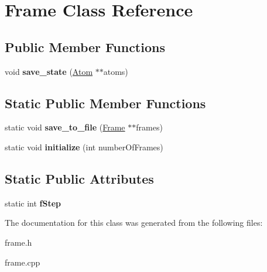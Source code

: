 \hypertarget{class_frame}{}\section{Frame Class Reference}
\label{class_frame}
\subsection*{Public Member Functions}
\begin{DoxyCompactItemize}
\item 
\mbox{\label{class_frame_a03b0febb7a423f343a97f5b937ca74bb}} 
void {\bfseries save\+\_\+state} (\mbox{\hyperlink{class_atom}{Atom}} $\ast$$\ast$atoms)
\end{DoxyCompactItemize}
\subsection*{Static Public Member Functions}
\begin{DoxyCompactItemize}
\item 
\mbox{\label{class_frame_aa3523e2ec8247c6c5f2bb102d5016971}} 
static void {\bfseries save\+\_\+to\+\_\+file} (\mbox{\hyperlink{class_frame}{Frame}} $\ast$$\ast$frames)
\item 
\mbox{\label{class_frame_a78558e230dba7e5bf57916d38af7536c}} 
static void {\bfseries initialize} (int number\+Of\+Frames)
\end{DoxyCompactItemize}
\subsection*{Static Public Attributes}
\begin{DoxyCompactItemize}
\item 
\mbox{\label{class_frame_ae7615c7221ced614d59ce461deed3a5f}} 
static int {\bfseries f\+Step}
\end{DoxyCompactItemize}


The documentation for this class was generated from the following files\+:\begin{DoxyCompactItemize}
\item 
frame.\+h\item 
frame.\+cpp\end{DoxyCompactItemize}
